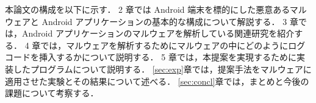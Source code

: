 本論文の構成を以下に示す．
2 章では Android 端末を標的にした悪意あるマルウェアと Android アプリケーションの基本的な構成について解説する．
3 章では，Android アプリケーションのマルウェアを解析している関連研究を紹介する．
4 章では，マルウェアを解析するためにマルウェアの中にどのようにログコードを挿入するかについて説明する．
5 章では，本提案を実現するために実装したプログラムについて説明する．
\ref{sec:exp}章では，提案手法をマルウェアに適用させた実験とその結果について述べる．
\ref{sec:concl}章では，まとめと今後の課題について考察する．